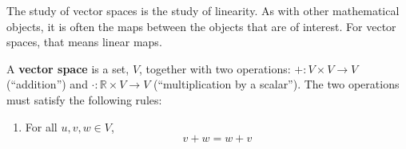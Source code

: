 \documentclass[10pt, a4paper, twocolumn]{article}
\newcommand{\R}{\mathbb{R}}
\newcommand{\defn}[1]{\textbf{#1}}
\begin{document}
The study of vector spaces is the study of linearity. As with other mathematical
objects, it is often the maps between the objects that are of interest. For
vector spaces, that means linear maps.

A \defn{vector space} is a set, $V$, together with two operations: ${+}:V\times V \to
V$ (“addition”) and ${\cdot}:\R \times V \to V$ (“multiplication by a
scalar”). The two operations must satisfy the following rules:
\begin{enumerate}
\item
  For all $u, v, w \in V$,
  \begin{equation*}    
    v+w = w+v
  \end{equation*}
\end{enumerate}
\end{document}
